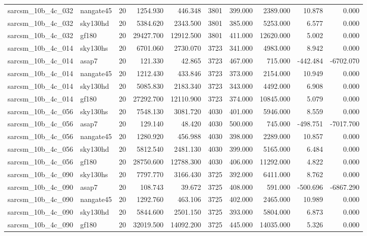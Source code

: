 \begin{longtable}{llrrrrrrrr}
sarcsm\_10b\_4c\_032 & nangate45 & 20 & 1254.930 & 446.348 & 3801 & 399.000 & 2389.000 & 10.878 & 0.000 \\
sarcsm\_10b\_4c\_032 & sky130hd & 20 & 5384.620 & 2343.500 & 3801 & 385.000 & 5253.000 & 6.577 & 0.000 \\
sarcsm\_10b\_4c\_032 & gf180 & 20 & 29427.700 & 12912.500 & 3801 & 411.000 & 12620.000 & 5.002 & 0.000 \\
sarcsm\_10b\_4c\_014 & sky130hs & 20 & 6701.060 & 2730.070 & 3723 & 341.000 & 4983.000 & 8.942 & 0.000 \\
sarcsm\_10b\_4c\_014 & asap7 & 20 & 121.330 & 42.865 & 3723 & 467.000 & 715.000 & -442.484 & -6702.070 \\
sarcsm\_10b\_4c\_014 & nangate45 & 20 & 1212.430 & 433.846 & 3723 & 373.000 & 2154.000 & 10.949 & 0.000 \\
sarcsm\_10b\_4c\_014 & sky130hd & 20 & 5085.830 & 2183.340 & 3723 & 343.000 & 4492.000 & 6.908 & 0.000 \\
sarcsm\_10b\_4c\_014 & gf180 & 20 & 27292.700 & 12110.900 & 3723 & 374.000 & 10845.000 & 5.079 & 0.000 \\
sarcsm\_10b\_4c\_056 & sky130hs & 20 & 7548.130 & 3081.720 & 4030 & 401.000 & 5946.000 & 8.559 & 0.000 \\
sarcsm\_10b\_4c\_056 & asap7 & 20 & 129.140 & 48.420 & 4030 & 500.000 & 745.000 & -498.751 & -7017.700 \\
sarcsm\_10b\_4c\_056 & nangate45 & 20 & 1280.920 & 456.988 & 4030 & 398.000 & 2289.000 & 10.857 & 0.000 \\
sarcsm\_10b\_4c\_056 & sky130hd & 20 & 5812.540 & 2481.130 & 4030 & 399.000 & 5165.000 & 6.484 & 0.000 \\
sarcsm\_10b\_4c\_056 & gf180 & 20 & 28750.600 & 12788.300 & 4030 & 406.000 & 11292.000 & 4.822 & 0.000 \\
sarcsm\_10b\_4c\_090 & sky130hs & 20 & 7797.770 & 3166.430 & 3725 & 392.000 & 6411.000 & 8.762 & 0.000 \\
sarcsm\_10b\_4c\_090 & asap7 & 20 & 108.743 & 39.672 & 3725 & 408.000 & 591.000 & -500.696 & -6867.290 \\
sarcsm\_10b\_4c\_090 & nangate45 & 20 & 1292.760 & 463.106 & 3725 & 402.000 & 2465.000 & 10.989 & 0.000 \\
sarcsm\_10b\_4c\_090 & sky130hd & 20 & 5844.600 & 2501.150 & 3725 & 393.000 & 5804.000 & 6.873 & 0.000 \\
sarcsm\_10b\_4c\_090 & gf180 & 20 & 32019.500 & 14092.200 & 3725 & 445.000 & 14035.000 & 5.326 & 0.000 \\

\end{longtable}
